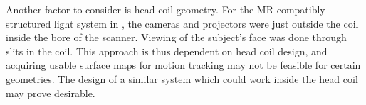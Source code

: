 \documentclass[class=article, crop=false]{standalone}
\begin{document}
\par 
Another factor to consider is head coil geometry. For the MR-compatibly structured light system in \cite{Olesen2015a}, the cameras and projectors were just outside the coil inside the bore of the scanner. Viewing of the subject's face was done through slits in the coil. This approach is thus dependent on head coil design, and acquiring usable surface maps for motion tracking may not be feasible for certain geometries. The design of a similar system which could work inside the head coil may prove desirable.


	
\end{document}
